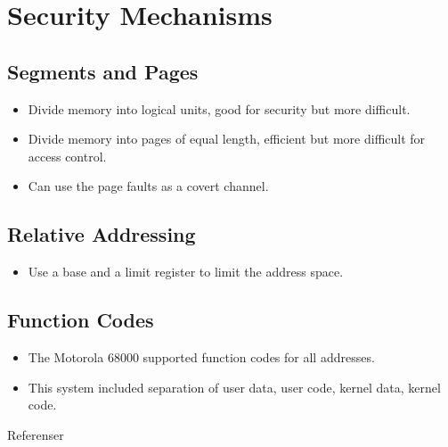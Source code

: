 \documentclass{beamer}
\begin{document}
\section{Security Mechanisms}

\subsection{Segments and Pages}

\begin{frame}{\insertsubsectionhead}
  \begin{itemize}
    \item Divide memory into logical units, good for security but more 
      difficult.
    \item Divide memory into pages of equal length, efficient but more 
      difficult for access control.
  \end{itemize}
\end{frame}

\begin{frame}{\insertsubsectionhead}
  \begin{itemize}
    \item Can use the page faults as a covert channel.
  \end{itemize}
\end{frame}

\subsection{Relative Addressing}

\begin{frame}{\insertsubsectionhead}
  \begin{itemize}
    \item Use a base and a limit register to limit the address space.
  \end{itemize}
\end{frame}

\subsection{Function Codes}

\begin{frame}{\insertsubsectionhead}
  \begin{itemize}
    \item The Motorola 68000 supported function codes for all addresses.
    \item This system included separation of user data, user code, kernel data, 
      kernel code.
  \end{itemize}
\end{frame}




\begin{frame}{Referenser}
  \small
  \printbibliography{}
\end{frame}
\end{document}

